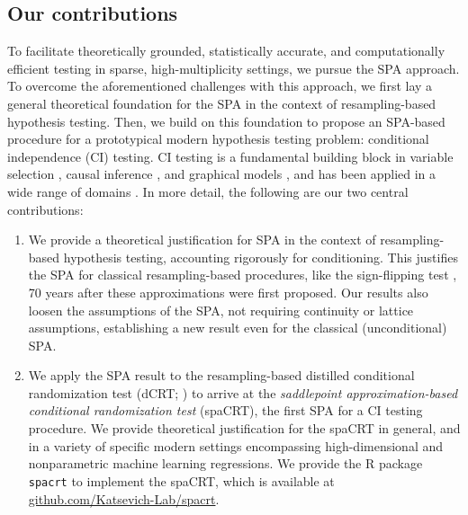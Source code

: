 \documentclass[12pt]{article}
\theoremstyle{definition}
\begin{document}
  \subsection{Our contributions}

  To facilitate theoretically grounded, statistically accurate, and computationally efficient testing in sparse, high-multiplicity settings, we pursue the SPA approach. To overcome the aforementioned challenges with this approach, we first lay a general theoretical foundation for the SPA in the context of resampling-based hypothesis testing. Then, we build on this foundation to propose an SPA-based procedure for a prototypical modern hypothesis testing problem: conditional independence (CI) testing. CI testing is a fundamental building block in variable selection \citep{CetL16}, causal inference \citep{Pearl2009a}, and graphical models \citep{Lauritzen1996,Koller2009}, and has been applied in a wide range of domains \citep{Magwene2004, sesia2019gene, Katsevich2020c, Sekulovski2024}. In more detail, the following are our two central contributions:
  
  \begin{enumerate}
	\item We provide a theoretical justification for SPA in the context of resampling-based hypothesis testing, accounting rigorously for conditioning. This justifies the SPA for classical resampling-based procedures, like the sign-flipping test \citep{Daniels1955}, 70 years after these approximations were first proposed. Our results also loosen the assumptions of the SPA, not requiring continuity or lattice assumptions, establishing a new result even for the classical (unconditional) SPA.
	\item We apply the SPA result to the resampling-based distilled conditional randomization test (dCRT; \cite{Liu2022a}) to arrive at the \textit{saddlepoint approximation-based conditional randomization test} (spaCRT), the first SPA for a CI testing procedure. We provide theoretical justification for the spaCRT in general, and in a variety of specific modern settings encompassing high-dimensional and nonparametric machine learning regressions. We provide the R package \verb|spacrt| to implement the spaCRT, which is available at \href{https://github.com/Katsevich-Lab/spacrt}{github.com/Katsevich-Lab/spacrt}.
  \end{enumerate}
  
\end{document}
